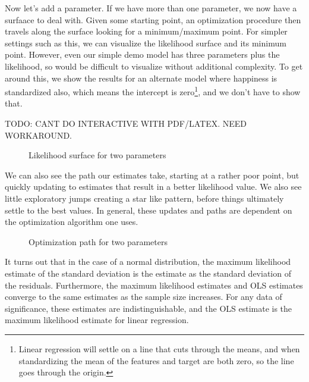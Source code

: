 \documentclass[
  letterpaper,
]{krantz}
\begin{document}
Now let's add a parameter. If we have more than one parameter, we now
have a surfaace to deal with. Given some starting point, an optimization
procedure then travels along the surface looking for a minimum/maximum
point. For simpler settings such as this, we can visualize the
likelihood surface and its minimum point. However, even our simple demo
model has three parameters plus the likelihood, so would be difficult to
visualize without additional complexity. To get around this, we show the
results for an alternate model where happiness is standardized also,
which means the intercept is zero\footnote{Linear regression will settle
  on a line that cuts through the means, and when standardizing the mean
  of the features and target are both zero, so the line goes through the
  origin.}, and we don't have to show that.

TODO: CANT DO INTERACTIVE WITH PDF/LATEX. NEED WORKAROUND.

\begin{figure}[H]


\caption{\label{fig-show-r-likelihood-surface}Likelihood surface for two
parameters}

\end{figure}%

We can also see the path our estimates take, starting at a rather poor
point, but quickly updating to estimates that result in a better
likelihood value. We also see little exploratory jumps creating a star
like pattern, before things ultimately settle to the best values. In
general, these updates and paths are dependent on the optimization
algorithm one uses.

\begin{figure}[H]


\caption{\label{fig-r-likelihood-path}Optimization path for two
parameters}

\end{figure}%

It turns out that in the case of a normal distribution, the maximum
likelihood estimate of the standard deviation is the estimate as the
standard deviation of the residuals. Furthermore, the maximum likelihood
estimates and OLS estimates converge to the same estimates as the sample
size increases. For any data of significance, these estimates are
indistinguishable, and the OLS estimate is the maximum likelihood
estimate for linear regression.
\end{document}
